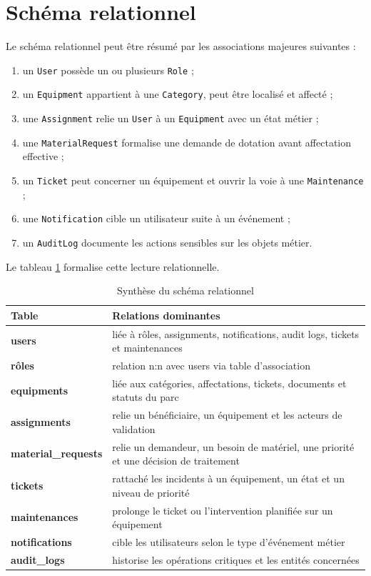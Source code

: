 ﻿\documentclass[12pt,a4paper,oneside]{report}
\begin{document}
\section{Schéma relationnel}
Le schéma relationnel peut être résumé par les associations majeures suivantes :
\begin{enumerate}
  \item un \texttt{User} possède un ou plusieurs \texttt{Role} ;
  \item un \texttt{Equipment} appartient à une \texttt{Category}, peut être localisé et affecté ;
  \item une \texttt{Assignment} relie un \texttt{User} à un \texttt{Equipment} avec un état métier ;
  \item une \texttt{MaterialRequest} formalise une demande de dotation avant affectation effective ;
  \item un \texttt{Ticket} peut concerner un équipement et ouvrir la voie à une \texttt{Maintenance} ;
  \item une \texttt{Notification} cible un utilisateur suite à un événement ;
  \item un \texttt{AuditLog} documente les actions sensibles sur les objets métier.
\end{enumerate}

Le tableau \ref{tab:schema-relationnel} formalise cette lecture relationnelle.

\begin{table}[H]
\centering
\caption{Synthèse du schéma relationnel}
\label{tab:schema-relationnel}
\begin{tabularx}{\textwidth}{>{\bfseries}p{3cm}X}
\toprule
Table & Relations dominantes \\
\midrule
users & liée à rôles, assignments, notifications, audit logs, tickets et maintenances \\
rôles & relation n:n avec users via table d'association \\
equipments & liée aux catégories, affectations, tickets, documents et statuts du parc \\
assignments & relie un bénéficiaire, un équipement et les acteurs de validation \\
material\_requests & relie un demandeur, un besoin de matériel, une priorité et une décision de traitement \\
tickets & rattaché les incidents à un équipement, un état et un niveau de priorité \\
maintenances & prolonge le ticket ou l'intervention planifiée sur un équipement \\
notifications & cible les utilisateurs selon le type d'événement métier \\
audit\_logs & historise les opérations critiques et les entités concernées \\
\bottomrule
\end{tabularx}
\end{table}
\end{document}
